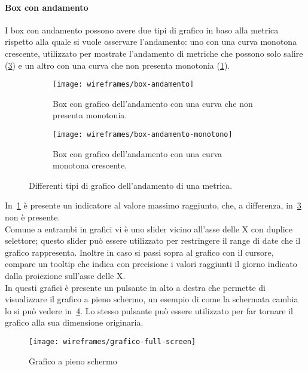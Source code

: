 \paragraph{Box con andamento}
I box con andamento possono avere due tipi di grafico in baso alla metrica rispetto alla quale si vuole osservare l'andamento: uno con una curva monotona crescente, utilizzato per mostrate l'andamento di metriche che possono solo salire (\ref{fig:box-andamento-monotono}) e un altro con una curva che non presenta monotonia (\ref{fig:box-andamento-no-monotonia}). 
\begin{figure}[H]
    \begin{subfigure}[b]{0.5\textwidth}
        \centering
        \texttt{[image: wireframes/box-andamento]}
        \caption{Box con grafico dell'andamento con una curva che non presenta monotonia.}
        \label{fig:box-andamento-no-monotonia}
    \end{subfigure}
\hfill
    \begin{subfigure}[b]{0.5\textwidth}
        \centering
        \texttt{[image: wireframes/box-andamento-monotono]}
        \caption{Box con grafico dell'andamento con una curva monotona crescente.}
        \label{fig:box-andamento-monotono}
    \end{subfigure}
    \caption{Differenti tipi di grafico dell'andamento di una metrica.}
\end{figure}

In~\ref{fig:box-andamento-no-monotonia} è presente un indicatore al valore massimo raggiunto, che, a differenza, in~\ref{fig:box-andamento-monotono} non è presente.\\
Comune a entrambi in grafici vi è uno slider vicino all'asse delle X con duplice selettore; questo slider può essere utilizzato per restringere il range di date che il grafico rappresenta. Inoltre in caso si passi sopra al grafico con il cursore, compare un tooltip che indica con precisione i valori raggiunti il giorno indicato dalla proiezione sull'asse delle X.\\
In questi grafici è presente un pulsante in alto a destra che permette di visualizzare il grafico a pieno schermo, un esempio di come la schermata cambia lo si può vedere in~\ref{fig:grafico-full-screen}. Lo stesso pulsante può essere utilizzato per far tornare il grafico alla sua dimensione originaria.
\begin{figure}[H]
    \centering
    \texttt{[image: wireframes/grafico-full-screen]}
    \caption{Grafico a pieno schermo}
    \label{fig:grafico-full-screen}
\end{figure}


